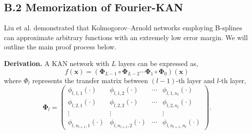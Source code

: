 \documentclass[letterpaper]{article} %
\begin{document}
\subsection{B.2 Memorization of Fourier-KAN}
Liu et al. \cite{liu2024kan} demonstrated that Kolmogorov–Arnold networks employing B-splines can approximate arbitrary functions with an extremely low error margin. We will outline the main proof process below.

\textbf{Derivation.}
A KAN network with $L$ layers can be expressed as,
\begin{equation}
    \label{eq:kan}
    f(\mathbf{x})=(\mathbf{\Phi}_{L-1}\circ \mathbf{\Phi}_{L-2} \cdots \mathbf{\Phi}_{1}  \circ \mathbf{\Phi}_{0})(\mathbf{x})
\end{equation} where $\Phi_l$ represents the transfer matrix between $(l-1)$-th layer and $l$-th layer,
$$
\mathbf{\Phi}_l={\left(\begin{array}{cccc}
\phi_{l, 1,1}(\cdot) & \phi_{l, 1,2}(\cdot) & \cdots & \phi_{l, 1, n_l}(\cdot) \\
\phi_{l, 2,1}(\cdot) & \phi_{l, 2,2}(\cdot) & \cdots & \phi_{l, 2, n_l}(\cdot) \\
\vdots & \vdots & & \vdots \\
\phi_{l, n_{l+1}, 1}(\cdot) & \phi_{l, n_{l+1}, 2}(\cdot) & \cdots & \phi_{l, n_{l+1}, n_l}(\cdot)
\end{array}\right)}.
$$
\end{document}

